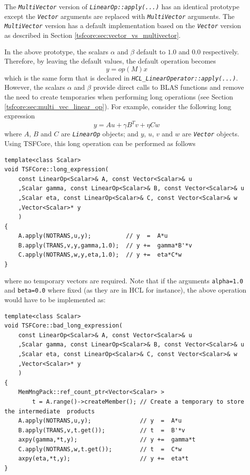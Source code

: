 The \texttt{\textit{Multi\-Vector}} version of
\texttt{\textit{LinearOp\-::apply(\-...)}} has an identical prototype
except the \texttt{\textit{Vector}} arguments are replaced with
\texttt{\textit{Multi\-Vector}} arguments.  The \texttt{\textit{Multi\-Vector}}
version has a default implementation based on the
\texttt{\textit{Vector}} version as described in Section
\ref{tsfcore:sec:vector_vs_multivector}.

In the above prototype, the scalars $\alpha$ and $\beta$ default to
$1.0$ and $0.0$ respectively.  Therefore, by leaving the default values,
the default operation becomes
%
\[
y = op(M) x
\]
%
which is the same form that is declared in
\texttt{\textit{HCL\-\_Linear\-Operator\-::apply(\-...)}}.  However, the scalars
$\alpha$ and $\beta$ provide direct calls to BLAS functions and remove
the need to create temporaries when performing long operations (see
Section \ref{tsfcore:sec:multi_vec_linear_op}).  For example, consider
the following long expression
%
\[
y = A u + \gamma B^T v + \eta C w
\]
%
where $A$, $B$ and $C$ are \texttt{\textit{LinearOp}} objects; and $y$,
$u$, $v$ and $w$ are \texttt{\textit{Vector}} objects.  Using TSFCore, this
long operation can be performed as follows

{\scriptsize\begin{verbatim}
template<class Scalar>
void TSFCore::long_expression(
    const LinearOp<Scalar>& A, const Vector<Scalar>& u
    ,Scalar gamma, const LinearOp<Scalar>& B, const Vector<Scalar>& u
    ,Scalar eta, const LinearOp<Scalar>& C, const Vector<Scalar>& w
    ,Vector<Scalar>* y
    )
{
    A.apply(NOTRANS,u,y);          // y  =  A*u
    B.apply(TRANS,v,y,gamma,1.0);  // y +=  gamma*B'*v
    C.apply(NOTRANS,w,y,eta,1.0);  // y +=  eta*C*w
}
\end{verbatim}}

\noindent where no temporary vectors are required.  Note that if the arguments
\texttt{alpha=1.0} and \texttt{beta=0.0} where fixed (as they are
in HCL for instance), the above operation would have to be implemented
as:

{\scriptsize\begin{verbatim}
template<class Scalar>
void TSFCore::bad_long_expression(
    const LinearOp<Scalar>& A, const Vector<Scalar>& u
    ,Scalar gamma, const LinearOp<Scalar>& B, const Vector<Scalar>& u
    ,Scalar eta, const LinearOp<Scalar>& C, const Vector<Scalar>& w
    ,Vector<Scalar>* y
    )
{
    MemMngPack::ref_count_ptr<Vector<Scalar> >
        t = A.range()->createMember(); // Create a temporary to store the intermediate  products
    A.apply(NOTRANS,u,y);              // y  =  A*u
    B.apply(TRANS,v,t.get());          // t  =  B'*v
    axpy(gamma,*t,y);                  // y +=  gamma*t
    C.apply(NOTRANS,w,t.get());        // t  =  C*w
    axpy(eta,*t,y);                    // y +=  eta*t
}
\end{verbatim}}

